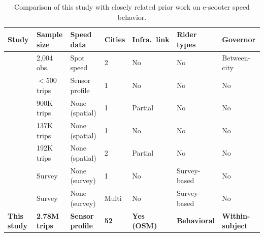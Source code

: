\begin{table}[htbp]
\centering
\caption{Comparison of this study with closely related prior work on e-scooter speed behavior.}
\label{tab:lit_comparison}
\small
\begin{tabular}{lllllll}
\toprule
\textbf{Study} & \textbf{Sample size} & \textbf{Speed data} & \textbf{Cities} & \textbf{Infra.\ link} & \textbf{Rider types} & \textbf{Governor} \\
\midrule
\citet{cicchino2023speed} & 2,004 obs. & Spot speed & 2 & No & No & Between-city \\
\citet{ma2021escooter} & $<$500 trips & Sensor profile & 1 & No & No & No \\
\citet{jiao2020shared} & 900K trips & None (spatial) & 1 & Partial & No & No \\
\citet{mckenzie2019spatiotemporal} & 137K trips & None (spatial) & 1 & No & No & No \\
\citet{bai2020dockless} & 192K trips & None (spatial) & 2 & Partial & No & No \\
\citet{degele2018identifying} & Survey & None (survey) & 1 & No & Survey-based & No \\
\citet{jena2025latent} & Survey & None (survey) & Multi & No & Survey-based & No \\
\addlinespace
\textbf{This study} & \textbf{2.78M trips} & \textbf{Sensor profile} & \textbf{52} & \textbf{Yes (OSM)} & \textbf{Behavioral} & \textbf{Within-subject} \\
\bottomrule
\end{tabular}
\end{table}
